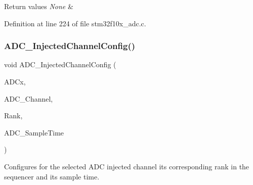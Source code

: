 \begin{DoxyRetVals}{Return values}
{\em None} & \\
\hline
\end{DoxyRetVals}


Definition at line 224 of file stm32f10x\+\_\+adc.\+c.

\mbox{\label{group___a_d_c___exported___functions_gae2b44bff080184e1cf6f2cb6b9bb3e59}} 
\subsubsection{\texorpdfstring{A\+D\+C\+\_\+\+Injected\+Channel\+Config()}{ADC\_InjectedChannelConfig()}}
{\footnotesize\ttfamily void A\+D\+C\+\_\+\+Injected\+Channel\+Config (\begin{DoxyParamCaption}\item[{\hyperlink{struct_a_d_c___type_def}{A\+D\+C\+\_\+\+Type\+Def} $\ast$}]{A\+D\+Cx,  }\item[{uint8\+\_\+t}]{A\+D\+C\+\_\+\+Channel,  }\item[{uint8\+\_\+t}]{Rank,  }\item[{uint8\+\_\+t}]{A\+D\+C\+\_\+\+Sample\+Time }\end{DoxyParamCaption})}



Configures for the selected A\+DC injected channel its corresponding rank in the sequencer and its sample time. 


